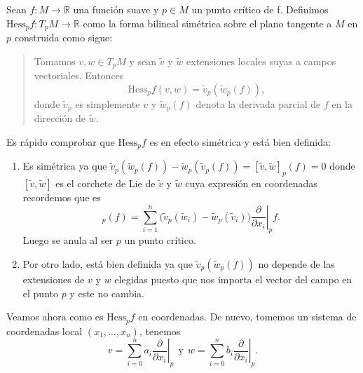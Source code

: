 \begin{definition}
    Sean $f:M\to \mathbb{R}$ una función suave y $p\in M$ un punto crítico de f. Definimos $\textrm{Hess}_{p}f: T_{p}M\to \mathbb{R}$ como la forma bilineal simétrica sobre el plano tangente a $M$ en $p$ construida como sigue:
    \begin{quote}
        Tomamos $v,w\in T_{p}M$ y sean $\tilde{v}$ y $\tilde{w}$ extensiones locales suyas a campos vectoriales. Entonces 
        \begin{equation*}
            \text{Hess}_{p}f(v,w)=\tilde{v}_{p}(\tilde{w}_{p}(f)),
        \end{equation*}
        donde $\tilde{v}_{p}$ es simplemente $v$ y $\tilde{w}_{p}(f)$ denota la derivada parcial de $f$ en la dirección de $\tilde{w}$.
    \end{quote}
\end{definition}
\bigskip
\begin{remark}
    Es rápido comprobar que $\text{Hess}_{p}f$ es en efecto simétrica y está bien definida:

    \begin{enumerate}[label=(\roman*)]
        \item Es simétrica ya que $\tilde{v}_{p}(\tilde{w}_{p}(f)) - \tilde{w}_{p}(\tilde{v}_{p}(f)) = [\tilde{v},\tilde{w}]_{p}(f) = 0$ donde $[\tilde{v},\tilde{w}]$ es el corchete de Lie de $\tilde{v}$ y $\tilde{w}$ cuya expresión en coordenadas recordemos que es
        \begin{equation*}
            [\tilde{v},\tilde{w}]_{p}(f)=\sum_{i=1}^n \big( \tilde{v}_p(\tilde{w}_{i}) - \tilde{w}_p(\tilde{v}_{i}) \big) \left. \frac{\partial}{\partial x_{i}}\right|_p f.
        \end{equation*}
        Luego se anula al ser $p$ un punto crítico.

        \item Por otro lado, está bien definida ya que $\tilde{v}_{p}(\tilde{w}_{p}(f))$ no depende de las extensiones de $v$ y $w$ elegidas puesto que nos importa el vector del campo en el punto $p$ y este no cambia.
    \end{enumerate}
\end{remark}
\bigskip

Veamos ahora como es $\text{Hess}_pf$ en coordenadas. De nuevo, tomemos un sistema de coordenadas local $(x_{1}, \dots ,x_{n})$, tenemos
\begin{equation*}
    v=\sum_{i=0}^n a_i \left.\frac{\partial}{\partial x_i}\right|_p ~~\text{y}~~ w=\sum_{i=0}^n b_i \left.\frac{\partial}{\partial x_i}\right|_p .
\end{equation*}
\medskip

